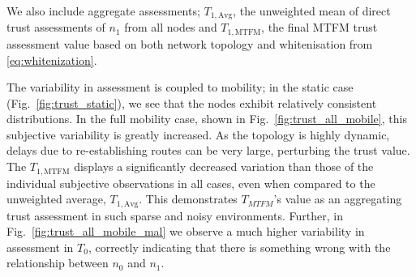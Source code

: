 \documentclass[conference]{IEEEtran}
\begin{document}
We also include aggregate assessments; $T_{1,\text{Avg}}$, the unweighted mean of direct trust assessments of $n_1$ from all nodes and $T_{1,\text{MTFM}}$, the final MTFM trust assessment value based on both network topology and whitenisation from \eqref{eq:whitenization}.

The variability in assessment is coupled to mobility; in the static case (Fig.~\ref{fig:trust_static}), we see that the nodes exhibit relatively consistent distributions.
In the full mobility case, shown in Fig.~\ref{fig:trust_all_mobile}, this subjective variability is greatly increased. 
As the topology is highly dynamic, delays due to re-establishing routes can be very large, perturbing the trust value.
The $T_{1,\text{MTFM}}$ displays a significantly decreased variation than those of the individual subjective observations in all cases, even when compared to the unweighted average, $T_{1,\text{Avg}}$.
This demonstrates $T_{MTFM}$'s value as an aggregating trust assessment in such sparse and noisy environments.
Further, in Fig.~\ref{fig:trust_all_mobile_mal} we observe a much higher variability in assessment in $T_0$, correctly indicating that there is something wrong with the relationship between $n_0$ and $n_1$.
\end{document}
